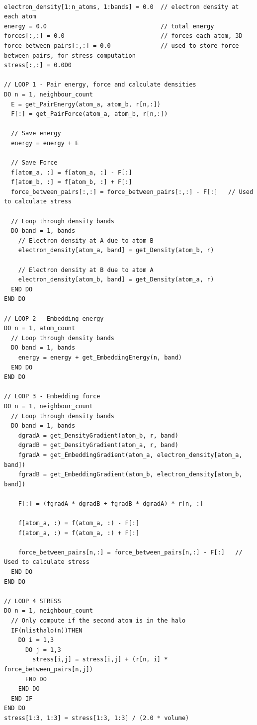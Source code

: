 \begin{lstlisting}[style=sPseudo,caption={Pseudo Code for Energy and Stress Force Calculation}, label={listing:efscalc}]

electron_density[1:n_atoms, 1:bands] = 0.0  // electron density at each atom
energy = 0.0                                // total energy
forces[:,:] = 0.0                           // forces each atom, 3D
force_between_pairs[:,:] = 0.0              // used to store force between pairs, for stress computation
stress[:,:] = 0.0D0

// LOOP 1 - Pair energy, force and calculate densities
DO n = 1, neighbour_count
  E = get_PairEnergy(atom_a, atom_b, r[n,:])
  F[:] = get_PairForce(atom_a, atom_b, r[n,:])

  // Save energy
  energy = energy + E

  // Save Force
  f[atom_a, :] = f[atom_a, :] - F[:]
  f[atom_b, :] = f[atom_b, :] + F[:]
  force_between_pairs[:,:] = force_between_pairs[:,:] - F[:]   // Used to calculate stress
  
  // Loop through density bands
  DO band = 1, bands
    // Electron density at A due to atom B
    electron_density[atom_a, band] = get_Density(atom_b, r)
  
    // Electron density at B due to atom A
    electron_density[atom_b, band] = get_Density(atom_a, r)
  END DO
END DO

// LOOP 2 - Embedding energy
DO n = 1, atom_count
  // Loop through density bands
  DO band = 1, bands
    energy = energy + get_EmbeddingEnergy(n, band)
  END DO
END DO

// LOOP 3 - Embedding force
DO n = 1, neighbour_count
  // Loop through density bands
  DO band = 1, bands
    dgradA = get_DensityGradient(atom_b, r, band)
    dgradB = get_DensityGradient(atom_a, r, band)
    fgradA = get_EmbeddingGradient(atom_a, electron_density[atom_a, band])
    fgradB = get_EmbeddingGradient(atom_b, electron_density[atom_b, band])

    F[:] = (fgradA * dgradB + fgradB * dgradA) * r[n, :]

    f[atom_a, :) = f(atom_a, :) - F[:] 
    f(atom_a, :) = f(atom_a, :) + F[:] 
    
    force_between_pairs[n,:] = force_between_pairs[n,:] - F[:]   // Used to calculate stress
  END DO
END DO

// LOOP 4 STRESS
DO n = 1, neighbour_count
  // Only compute if the second atom is in the halo 
  IF(nlisthalo(n))THEN  
    DO i = 1,3
      DO j = 1,3
        stress[i,j] = stress[i,j] + (r[n, i] * force_between_pairs[n,j])
      END DO
    END DO
  END IF
END DO
stress[1:3, 1:3] = stress[1:3, 1:3] / (2.0 * volume)

\end{lstlisting}




